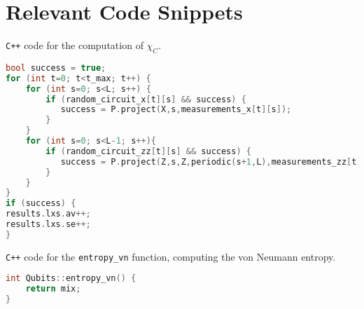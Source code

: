 \chapter{Relevant Code Snippets}
\label{ch:apdx-code}

\lstset{style=myStyle}

\verb|C++| code for the computation of $\chi_C$.
\begin{lstlisting}[caption=Computation of the linear cross entropy for one
  measurement history of a circuit, label={lst:lxe-cpp}, language=C++]
bool success = true; 
for (int t=0; t<t_max; t++) {
    for (int s=0; s<L; s++) {
        if (random_circuit_x[t][s] && success) {
           success = P.project(X,s,measurements_x[t][s]);
        }
    }
    for (int s=0; s<L-1; s++){
        if (random_circuit_zz[t][s] && success) {
           success = P.project(Z,s,Z,periodic(s+1,L),measurements_zz[t][s]);
        }
    }
}
if (success) {
results.lxs.av++;
results.lxs.se++;
}
\end{lstlisting}

\verb|C++| code for the \verb|entropy_vn| function, computing the von Neumann
entropy.
\begin{lstlisting}[caption=\texttt{entropy\_vn} function in the simulator,
label={lst:entropy-vn-cpp}, language=C++]
int Qubits::entropy_vn() {
    return mix;
}
\end{lstlisting}

